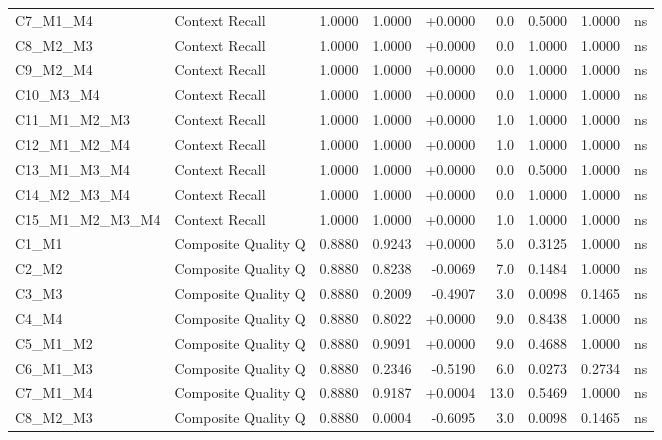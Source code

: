 \begin{table}[p]
\begin{tabular*}{\textwidth}{@{\extracolsep{\fill}} l l r r r r r r c @{}}
\addlinespace
C7\_M1\_M4      & Context Recall       & 1.0000 & 1.0000 & +0.0000 & 0.0 & 0.5000 & 1.0000 & ns \\
\addlinespace
C8\_M2\_M3      & Context Recall       & 1.0000 & 1.0000 & +0.0000 & 0.0 & 1.0000 & 1.0000 & ns \\
\addlinespace
C9\_M2\_M4      & Context Recall       & 1.0000 & 1.0000 & +0.0000 & 0.0 & 1.0000 & 1.0000 & ns \\
\addlinespace
C10\_M3\_M4     & Context Recall       & 1.0000 & 1.0000 & +0.0000 & 0.0 & 1.0000 & 1.0000 & ns \\
\addlinespace
C11\_M1\_M2\_M3 & Context Recall       & 1.0000 & 1.0000 & +0.0000 & 1.0 & 1.0000 & 1.0000 & ns \\
\addlinespace
C12\_M1\_M2\_M4 & Context Recall       & 1.0000 & 1.0000 & +0.0000 & 1.0 & 1.0000 & 1.0000 & ns \\
\addlinespace
C13\_M1\_M3\_M4 & Context Recall       & 1.0000 & 1.0000 & +0.0000 & 0.0 & 0.5000 & 1.0000 & ns \\
\addlinespace
C14\_M2\_M3\_M4 & Context Recall       & 1.0000 & 1.0000 & +0.0000 & 0.0 & 1.0000 & 1.0000 & ns \\
\addlinespace
C15\_M1\_M2\_M3\_M4 & Context Recall       & 1.0000 & 1.0000 & +0.0000 & 1.0 & 1.0000 & 1.0000 & ns \\
\addlinespace
C1\_M1          & Composite Quality Q  & 0.8880 & 0.9243 & +0.0000 & 5.0 & 0.3125 & 1.0000 & ns \\
\addlinespace
C2\_M2          & Composite Quality Q  & 0.8880 & 0.8238 & -0.0069 & 7.0 & 0.1484 & 1.0000 & ns \\
\addlinespace
C3\_M3          & Composite Quality Q  & 0.8880 & 0.2009 & -0.4907 & 3.0 & 0.0098 & 0.1465 & ns \\
\addlinespace
C4\_M4          & Composite Quality Q  & 0.8880 & 0.8022 & +0.0000 & 9.0 & 0.8438 & 1.0000 & ns \\
\addlinespace
C5\_M1\_M2      & Composite Quality Q  & 0.8880 & 0.9091 & +0.0000 & 9.0 & 0.4688 & 1.0000 & ns \\
\addlinespace
C6\_M1\_M3      & Composite Quality Q  & 0.8880 & 0.2346 & -0.5190 & 6.0 & 0.0273 & 0.2734 & ns \\
\addlinespace
C7\_M1\_M4      & Composite Quality Q  & 0.8880 & 0.9187 & +0.0004 & 13.0 & 0.5469 & 1.0000 & ns \\
\addlinespace
C8\_M2\_M3      & Composite Quality Q  & 0.8880 & 0.0004 & -0.6095 & 3.0 & 0.0098 & 0.1465 & ns \\

\end{tabular*}
\end{table}
